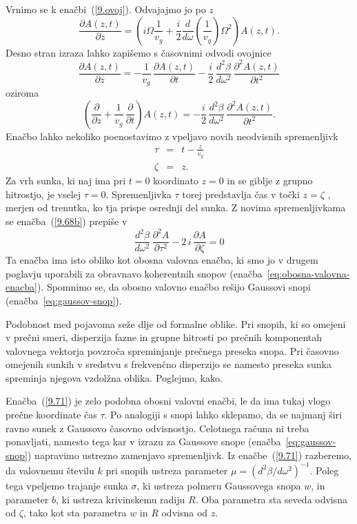 Vrnimo se k enačbi~(\ref{9.ovoj}). Odvajajmo jo po $z$ 
\begin{equation}
 \frac{\partial A(z,t)}{\partial z} = \left( i\Omega \frac{1}{v_g}+ \frac{i}{2}
\frac{d}{d\omega} \left(\frac{1}{v_g}\right) \Omega^2 \right) A(z,t).
\label{9.67}
\end{equation}
Desno stran izraza lahko zapišemo s časovnimi odvodi ovojnice 
\begin{equation}
\frac{\partial A(z,t)}{\partial z} = -\frac{1}{v_{g}}\,\frac{\partial A (z,t)}{\partial t}
-\frac{i}{2}\,\frac{d^{2}\beta}{d\omega^{2}}\,\frac{\partial^{2}A\left(z,t\right)}{\partial t^{2}}
\label{9.68} 
\end{equation}
oziroma
\begin{equation}
\left(\frac{\partial}{\partial z} + \frac{1}{v_{g}}\,\frac{\partial }{\partial t}\right)A (z,t) = 
-\frac{i}{2}\,\frac{d^{2}\beta}{d\omega^{2}}\,\frac{\partial^{2}A\left(z,t\right)}{\partial t^{2}}.
\label{9.68b} 
\end{equation}
Enačbo lahko nekoliko poenostavimo z vpeljavo novih neodvisnih spremenljivk
\begin{eqnarray}
\tau & = & t-\frac{z}{v_{g}}\nonumber \\
\zeta & = & z.
\label{9.70}
\end{eqnarray}
Za vrh sunka, ki naj ima pri $t=0$ koordinato $z=0$ in se giblje
z grupno hitrostjo, je vselej $\tau=0$. Spremenljivka $\tau$ torej predstavlja
čas v točki $z=\zeta$ , merjen od trenutka, ko tja
prispe osrednji del sunka. Z novima spremenljivkama se enačba~(\ref{9.68b})
prepiše v 
\begin{equation}
\frac{d^{2}\beta}{d\omega^{2}}\,\frac{\partial^{2}A}{\partial\tau^{2}}-
2\, i\,\frac{\partial A}{\partial\zeta}=0
\label{9.71}
\end{equation}
Ta enačba ima isto obliko kot obosna valovna enačba, ki smo jo v
drugem poglavju uporabili za obravnavo koherentnih 
snopov (enačba~\ref{eq:obosna-valovna-enacba}). Spomnimo se, da 
obosno valovno enačbo rešijo Gaussovi snopi (enačba~\ref{eq:gaussov-snop}). 

Podobnost med pojavoma seže dlje od formalne oblike. Pri snopih, ki so omejeni 
v prečni smeri, disperzija fazne in grupne hitrosti po prečnih komponentah valovnega
vektorja povzroča spreminjanje prečnega preseka snopa. Pri časovno
omejenih sunkih v sredstvu s frekvenčno disperzijo se namesto preseka sunka
spreminja njegova vzdolžna oblika. Poglejmo, kako.

Enačba~(\ref{9.71}) je zelo podobna obosni valovni enačbi, le da ima tukaj vlogo 
prečne koordinate čas $\tau$. Po analogiji s snopi lahko sklepamo, da se najmanj 
širi ravno sunek z Gaussovo časovno odvisnostjo. Celotnega računa
ni treba ponavljati, namesto tega kar v izrazu za Gaussove snope 
(enačba~\ref{eq:gaussov-snop}) napravimo ustrezno zamenjavo spremenljivk. 
Iz enačbe~(\ref{9.71}) razberemo, da valovnemu številu $k$ pri snopih  
ustreza parameter $\mu=(d^{2}\beta/d\omega^{2})^{-1}$. Poleg tega vpeljemo
trajanje sunka $\sigma$, ki ustreza polmeru Gaussovega snopa $w$, in parameter
$b$, ki ustreza krivinskemu radiju $R$. Oba parametra sta seveda odvisna od $\zeta$, 
tako kot sta parametra $w$ in $R$ odvisna od $z$. 


